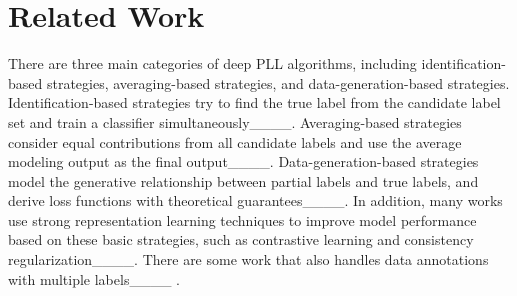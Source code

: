 \section{Related Work}
There are three main categories of deep PLL algorithms, including identification-based strategies, averaging-based strategies, and data-generation-based strategies. Identification-based strategies try to find the true label from the candidate label set and train a classifier simultaneously____. Averaging-based strategies consider equal contributions from all candidate labels and use the average modeling output as the final output____. Data-generation-based strategies model the generative relationship between partial labels and true labels, and derive loss functions with theoretical guarantees____. In addition, many works use strong representation learning techniques to improve model performance based on these basic strategies, such as contrastive learning and consistency regularization____. There are some work that also handles data annotations with multiple labels____ .
